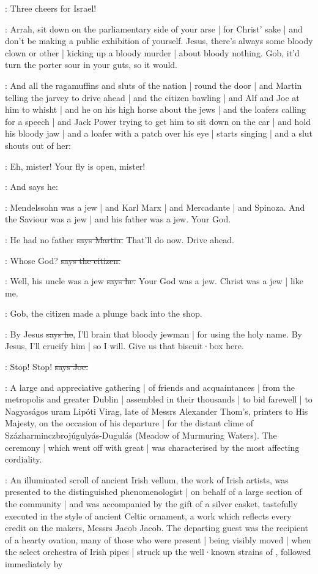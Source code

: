 \citizen:
Three cheers for Israel!

\Nq:
Arrah,
sit down on the parliamentary side of your arse |
for Christ' sake |
and don't be making a public exhibition of yourself.
Jesus,
there's always some bloody clown or other |
kicking up a bloody murder |
about bloody nothing.
Gob,
it'd turn the porter sour in your guts,
so it would.

\Nq:
And all the ragamuffins and sluts of the nation |
round the door |
and Martin telling the jarvey to drive ahead |
and the citizen bawling |
and Alf and Joe at him to whisht |
and he on his high horse about the jews |
and the loafers calling for a speech |
and Jack Power trying to get him to sit down on the car |
and hold his bloody jaw
 |
and a loafer with a patch over his eye |
starts singing  |
and a slut shouts out of her:

\ragamuffin:
Eh,
mister!
Your fly is open,
mister!

\Nq:
And says he:

\Bloom:
Mendelssohn was a jew |
and Karl Marx |
and Mercadante |
and Spinoza.
And the Saviour was a jew |
and his father was a jew.
Your God.

\cunningham:
He had no father
\sout{says Martin.}
That'll do now.
Drive ahead.

\citizen:
Whose God?
\sout{says the citizen.}

\Bloom:
Well,
his uncle was a jew
\sout{says he.}
Your God was a jew.
Christ was a jew |
like me.

\Nq:
Gob,
the citizen made a plunge back into the shop.

\citizen:
By Jesus
\sout{says he},
I'll brain that bloody jewman |
for using the holy name.
By Jesus,
I'll crucify him |
so I will.
Give us that biscuit·box here.

\joe:
Stop!
Stop!
\sout{says Joe.}

:
A large and appreciative gathering |
of friends and acquaintances |
from the metropolis and greater Dublin |
assembled in their thousands |
to bid farewell |
to Nagyaságos uram Lipóti Virag,
late of Messrs Alexander Thom's,
printers to His Majesty,
on the occasion of his departure |
for the distant clime of Százharminczbrojúgulyás-Dugulás
(Meadow of Murmuring Waters).
The ceremony |
which went off with great  |
was characterised by the most affecting cordiality.%

:
An illuminated scroll of ancient Irish vellum,
the work of Irish artists,
was presented to the distinguished phenomenologist |
on behalf of a large section of the community |
and was accompanied by the gift of a silver casket,
tastefully executed in the style of ancient Celtic ornament,
a work which reflects every credit on the makers,
Messrs Jacob  Jacob.
The departing guest was the recipient of a hearty ovation,
many of those who were present |
being visibly moved |
when the select orchestra of Irish pipes |
struck up the well·known strains of ,
followed immediately by 

